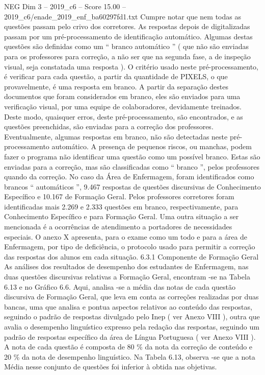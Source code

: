 \begin{textsample}{NEG Dim 3 – 2019\_c6 – Score 15.00 – 2019\_c6/enade\_2019\_enf\_ba60297fd1.txt}
Cumpre notar que nem todas as questões passam pelo crivo dos corretores.
As respostas depois de digitalizadas passam por um pré-processamento de identificação automático.
Algumas destas questões são definidas como um “ branco automático ” ( que não são enviadas para os professores para correção, a não ser que na segunda fase, a de inspeção visual, seja constatada uma resposta ).
O critério usado neste pré-processamento, é verificar para cada questão, a partir da quantidade de PIXELS, o que provavelmente, é uma resposta em branco.
A partir da separação destes documentos que foram considerados em branco, eles são enviados para uma verificação visual, por uma equipe de colaboradores, devidamente treinados.
Deste modo, quaisquer erros, deste pré-processamento, são encontrados, e as questões preenchidas, são enviadas para a correção dos professores.
Eventualmente, algumas respostas em branco, não são detectadas neste pré-processamento automático.
A presença de pequenos riscos, ou manchas, podem fazer o programa não identificar uma questão como um possível branco.
Estas são enviadas para a correção, mas são classificadas como “ branco ”, pelos professores quando da correção.
No caso da Área de Enfermagem, foram identificados como brancos “ automáticos ”, 9.467 respostas de questões discursivas de Conhecimento Específico e 10.167 de Formação Geral.
Pelos professores corretores foram identificadas mais 2.269 e 2.333 questões em branco, respectivamente, para Conhecimento Específico e para Formação Geral.
Uma outra situação a ser mencionada é a ocorrências de atendimento a portadores de necessidades especiais.
O anexo X apresenta, para o exame como um todo e para a área de Enfermagem, por tipo de deficiência, o protocolo usado para permitir a correção das respostas dos alunos em cada situação. 6.3.1 Componente de Formação Geral As análises dos resultados de desempenho dos estudantes de Enfermagem, nas duas questões discursivas relativas a Formação Geral, encontram -se na Tabela 6.13 e no Gráfico 6.6.
Aqui, analisa -se a média das notas de cada questão discursiva de Formação Geral, que leva em conta as correções realizadas por duas bancas, uma que analisa e pontua aspectos relativos ao conteúdo das respostas, seguindo o padrão de respostas divulgado pelo Inep ( ver Anexo VIII ), outra que avalia o desempenho linguístico expresso pela redação das respostas, seguindo um padrão de respostas específico da área de Língua Portuguesa ( ver Anexo VIII ).
A nota de cada questão é composta de 80 \% da nota da correção de conteúdo e 20 \% da nota de desempenho linguístico.
Na Tabela 6.13, observa -se que a nota Média nesse conjunto de questões foi inferior à obtida nas objetivas.

\end{textsample}
